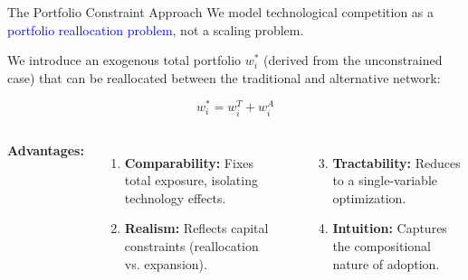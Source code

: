 \documentclass[aspectratio=169]{beamer}
\begin{document}
\begin{frame}{The Portfolio Constraint Approach}
    We model technological competition as a \textcolor{blue}{portfolio reallocation problem}, not a scaling problem.
    
    \vspace{0.3cm}
    
    We introduce an exogenous total portfolio $w_i^*$ (derived from the unconstrained case) that can be reallocated between the traditional and alternative network:
    
    \begin{equation}
        \boxed{w_i^* = w_i^T + w_i^A}
    \end{equation}
    
    \vspace{0.3cm}
    \begin{columns}[T]
        \textbf{Advantages:}
        \begin{enumerate}
            \item \textbf{Comparability:} Fixes total exposure, isolating technology effects.
            \item \textbf{Realism:} Reflects capital constraints (reallocation vs. expansion).
        \end{enumerate}
        
        \textbf{\phantom{Advantages:}}
        \begin{enumerate}
            \setcounter{enumi}{2}
            \item \textbf{Tractability:} Reduces to a single-variable optimization.
            \item \textbf{Intuition:} Captures the compositional nature of adoption.
        \end{enumerate}
    \end{columns}
\end{frame}
\end{document}
